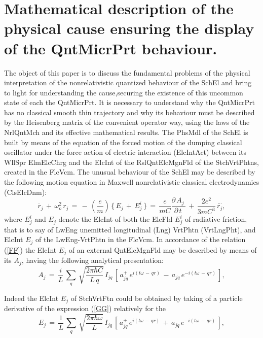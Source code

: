 \documentclass[12pt]{article}
\begin{document}
\section{ Mathematical description of the physical cause ensuring the display
of the QntMicrPrt behaviour.}

 The object of this paper is to discuss the fundamental problems of the
physical interpretation of the nonrelativistic quantized behaviour of the
SchEl and bring to light for understanding the cause,securing the existence
of this uncommon state of each the QntMicrPrt. It is necessary to understand
why the QntMicrPrt has no classical smooth thin trajectory and why its
behaviour must be described by the Heisenberg matrix of the convenient
operator way, using the laws of the NrlQntMch and its effective mathematical
results. The PhsMdl of the SchEl is built by means of the equation of the
forced motion of the dumping classical oscillator under the force action of
electric interaction (ElcIntAct) between its WllSpr ElmElcChrg and the ElcInt
of the RslQntElcMgnFld of the StchVrtPhtns, created in the FlcVcm. The
unusual behaviour of the SchEl may be described by the following motion
equation in Maxwell nonrelativistic classical electrodynamics (ClsElcDnm):
\begin{equation}\label{FF}
\ddot{r_j}\,+\,\omega_o^2\,r_j\,=\,-\,(\frac{e}{m})\,\{\,E_j\,+
\,E_j^i\,\}\,=\,\frac{e}{mC}\frac{\partial\,A_j\,}{\partial\,t\,}\,+
\,\frac{2e^2}{3mC^3}\,\stackrel{\cdots}{r_j},
\end{equation}
where $E_j^i$ and $E_j$ denote the ElcInt of both the ElcFld $E_j^i$ of
radiative friction, that is to say of LwEng unemitted longitudinal (Lng)
VrtPhtn (VrtLngPht), and ElcInt $E_j$ of the LwEng-VrtPhtn in the FlcVcm.
In accordance of the relation (\ref{FF}) the ElcInt $E_j$ of an external
QntElcMgnFld may be described by means of its $A_j$, having the following
analytical presentation:
\begin{equation}\label{GG}
A_j\,=\,\frac{i}{L}\,\sum_q\,\sqrt{\frac{2\pi\hbar C}{L\,q}}\,I_{jq}\,
\left[\,a_{jq}^+\,e^{i(t\omega\,-\,qr)}\,-
\,a_{jq}\,e^{-i(t\omega\,-\,qr)}\,\right],
\end{equation}

 Indeed the ElcInt $E_j$ of StchVrtFtn could be obtained by taking of
a particle derivative of the expression (\ref{GG}) relatively for the
\begin{equation}\label{HH}
E_j\,=\,\frac{1}{L}\,\sum_q\,\sqrt{\frac{2\pi\hbar\omega}{\,L\,}}\,I_{jq}\,
\left[\,a_{jq}^+\,e^{i(t\omega\,-\,qr)}\,+
\,a_{jq}\,e^{-i(t\omega\,-\,qr)}\,\right],
\end{equation}
\end{document}
